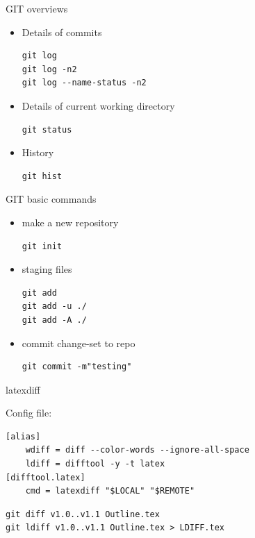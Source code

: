 \begin{frame}[fragile]{GIT overviews}

  \begin{itemize}
  \item Details of commits
\begin{verbatim}
git log
git log -n2
git log --name-status -n2
\end{verbatim}
  \item Details of current working directory
\begin{verbatim}
git status
\end{verbatim}
  \item History
\begin{verbatim}
git hist
\end{verbatim}
{}
  \end{itemize}
\end{frame}




\begin{frame}[fragile]{GIT basic commands}

  \begin{itemize}
  \item make a new repository
\begin{verbatim}
git init
\end{verbatim}
  \item staging files
\begin{verbatim}
git add
git add -u ./
git add -A ./
\end{verbatim}
  \item commit change-set to repo
\begin{verbatim}
git commit -m"testing"
\end{verbatim}
  \end{itemize}
\end{frame}




\begin{frame}[fragile]{latexdiff}

Config file:
\begin{verbatim}
[alias]
    wdiff = diff --color-words --ignore-all-space
    ldiff = difftool -y -t latex
[difftool.latex]
    cmd = latexdiff "$LOCAL" "$REMOTE"
\end{verbatim}
  
\begin{verbatim}
git diff v1.0..v1.1 Outline.tex
git ldiff v1.0..v1.1 Outline.tex > LDIFF.tex
\end{verbatim}

\end{frame}


